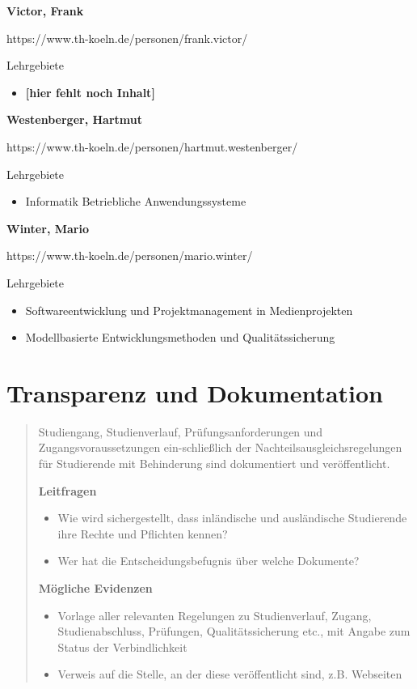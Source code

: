 \textbf{Victor, Frank}

https://www.th-koeln.de/personen/frank.victor/

Lehrgebiete

\begin{itemize}
\tightlist
\item
  \textbf{{[}hier fehlt noch Inhalt{]}}
\end{itemize}

\textbf{Westenberger, Hartmut}

https://www.th-koeln.de/personen/hartmut.westenberger/

Lehrgebiete

\begin{itemize}
\tightlist
\item
  Informatik Betriebliche Anwendungssysteme
\end{itemize}

\textbf{Winter, Mario}

https://www.th-koeln.de/personen/mario.winter/

Lehrgebiete

\begin{itemize}
\tightlist
\item
  Softwareentwicklung und Projektmanagement in Medienprojekten
\item
  Modellbasierte Entwicklungsmethoden und Qualitätssicherung
\end{itemize}

\chapter{Transparenz und
Dokumentation}\label{transparenz-und-dokumentation}

\begin{quote}
Studiengang, Studienverlauf, Prüfungsanforderungen und
Zugangsvoraussetzungen ein-schließlich der Nachteilsausgleichsregelungen
für Studierende mit Behinderung sind dokumentiert und veröffentlicht.

\textbf{Leitfragen}

\begin{itemize}
\item
  Wie wird sichergestellt, dass inländische und ausländische Studierende
  ihre Rechte und Pflichten kennen?
\item
  Wer hat die Entscheidungsbefugnis über welche Dokumente?
\end{itemize}

\textbf{Mögliche Evidenzen}

\begin{itemize}
\item
  Vorlage aller relevanten Regelungen zu Studienverlauf, Zugang,
  Studienabschluss, Prüfungen, Qualitätssicherung etc., mit Angabe zum
  Status der Verbindlichkeit
\item
  Verweis auf die Stelle, an der diese veröffentlicht sind, z.B.
  Webseiten
\end{itemize}
\end{quote}

